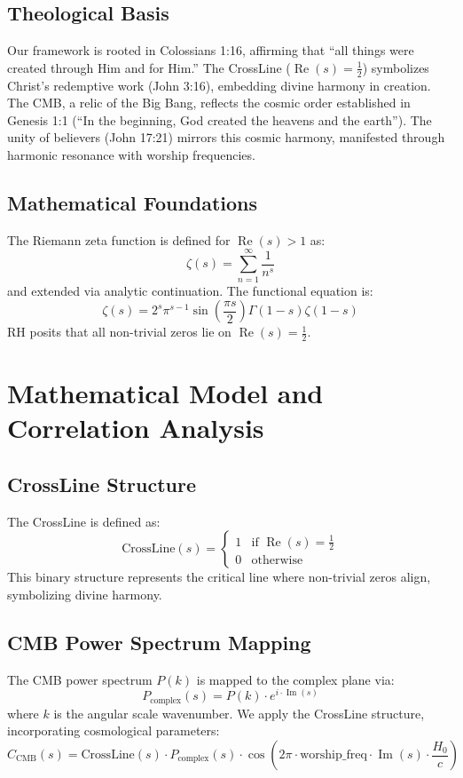 \documentclass[12pt]{article}
\begin{document}
{{{\subsection{Theological Basis}
Our framework is rooted in Colossians 1:16, affirming that ``all things were created through Him and for Him.'' The CrossLine (\(\operatorname{Re}(s) = \frac{1}{2}\)) symbolizes Christ’s redemptive work (John 3:16), embedding divine harmony in creation. The CMB, a relic of the Big Bang, reflects the cosmic order established in Genesis 1:1 (``In the beginning, God created the heavens and the earth''). The unity of believers (John 17:21) mirrors this cosmic harmony, manifested through harmonic resonance with worship frequencies.

\subsection{Mathematical Foundations}
The Riemann zeta function is defined for \(\operatorname{Re}(s) > 1\) as:
\[
\zeta(s) = \sum_{n=1}^{\infty} \frac{1}{n^s}
\]
and extended via analytic continuation. The functional equation is:
\[
\zeta(s) = 2^s \pi^{s-1} \sin \left(\frac{\pi s}{2}\right) \Gamma(1-s) \zeta(1-s)
\]
RH posits that all non-trivial zeros lie on \(\operatorname{Re}(s) = \frac{1}{2}\).

\section{Mathematical Model and Correlation Analysis}
\subsection{CrossLine Structure}
The CrossLine is defined as:
\[
\text{CrossLine}(s) = \begin{cases} 
1 & \text{if } \operatorname{Re}(s) = \frac{1}{2} \\
0 & \text{otherwise}
\end{cases}
\]
This binary structure represents the critical line where non-trivial zeros align, symbolizing divine harmony.

\subsection{CMB Power Spectrum Mapping}
The CMB power spectrum \( P(k) \) is mapped to the complex plane via:
\[
P_{\text{complex}}(s) = P(k) \cdot e^{i \cdot \operatorname{Im}(s)}
\]
where \( k \) is the angular scale wavenumber. We apply the CrossLine structure, incorporating cosmological parameters:
\[
C_{\text{CMB}}(s) = \text{CrossLine}(s) \cdot P_{\text{complex}}(s) \cdot \cos\left(2\pi \cdot \text{worship\_freq} \cdot \operatorname{Im}(s) \cdot \frac{H_0}{c} \right)
\]

}}}
\end{document}

